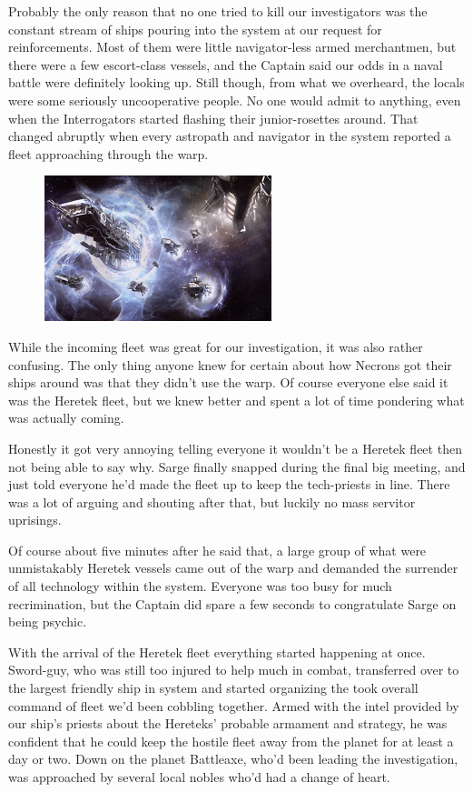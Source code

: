 Probably the only reason that no one tried to kill our investigators was the constant stream of ships pouring into the system at our request for reinforcements. 
Most of them were little navigator-less armed merchantmen, but there were a few escort-class vessels, and the Captain said our odds in a naval battle were definitely looking up. 
Still though, from what we overheard, the locals were some seriously uncooperative people. 
No one would admit to anything, even when the Interrogators started flashing their junior-rosettes around. 
That changed abruptly when every astropath and navigator in the system reported a fleet approaching through the warp.

\begin{figure}
	\begin{center}
		\includegraphics[width=\figwidth]{pics/11/72.png}
	\end{center}
\end{figure}
While the incoming fleet was great for our investigation, it was also rather confusing. 
The only thing anyone knew for certain about how Necrons got their ships around was that they didn't use the warp. 
Of course everyone else said it was the Heretek fleet, but we knew better and spent a lot of time pondering what was actually coming. 


Honestly it got very annoying telling everyone it wouldn't be a Heretek fleet then not being able to say why. 
Sarge finally snapped during the final big meeting, and just told everyone he'd made the fleet up to keep the tech-priests in line. 
There was a lot of arguing and shouting after that, but luckily no mass servitor uprisings.

Of course about five minutes after he said that, a large group of what were unmistakably Heretek vessels came out of the warp and demanded the surrender of all technology within the system. 
Everyone was too busy for much recrimination, but the Captain did spare a few seconds to congratulate Sarge on being psychic.

With the arrival of the Heretek fleet everything started happening at once. 
Sword-guy, who was still too injured to help much in combat, transferred over to the largest friendly ship in system and started organizing the took overall command of fleet we'd been cobbling together. 
Armed with the intel provided by our ship's priests about the Hereteks' probable armament and strategy, he was confident that he could keep the hostile fleet away from the planet for at least a day or two. 
Down on the planet Battleaxe, who'd been leading the investigation, was approached by several local nobles who'd had a change of heart.


